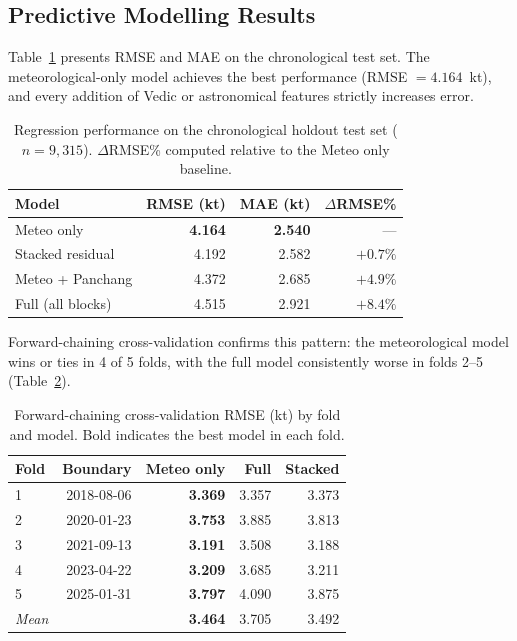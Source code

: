 \documentclass[12pt,a4paper]{article}
\begin{document}
\subsection{Predictive Modelling Results}

Table~\ref{tab:rmse} presents RMSE and MAE on the chronological test set.
The meteorological-only model achieves the best performance
(RMSE $= 4.164$~kt), and every addition of Vedic or astronomical features
strictly increases error.

\begin{table}[H]
  \centering
  \caption{Regression performance on the chronological holdout test set
  ($n = 9{,}315$). $\Delta$RMSE\% computed relative to the Meteo only baseline.}
  \label{tab:rmse}
  \begin{tabular}{lrrr}
    \toprule
    \textbf{Model} & \textbf{RMSE (kt)} & \textbf{MAE (kt)} & \boldmath$\Delta$\textbf{RMSE\%} \\
    \midrule
    Meteo only            & \textbf{4.164} & \textbf{2.540} & --- \\
    Stacked residual      & 4.192 & 2.582 & $+0.7\%$ \\
    Meteo + Panchang      & 4.372 & 2.685 & $+4.9\%$ \\
    Full (all blocks)     & 4.515 & 2.921 & $+8.4\%$ \\
    \bottomrule
  \end{tabular}
\end{table}

Forward-chaining cross-validation confirms this pattern: the meteorological
model wins or ties in 4 of 5 folds, with the full model consistently worse
in folds 2--5 (Table~\ref{tab:cv}).

\begin{table}[H]
  \centering
  \caption{Forward-chaining cross-validation RMSE (kt) by fold and model.
  Bold indicates the best model in each fold.}
  \label{tab:cv}
  \begin{tabular}{lrrrr}
    \toprule
    \textbf{Fold} & \textbf{Boundary} & \textbf{Meteo only} & \textbf{Full} & \textbf{Stacked} \\
    \midrule
    1 & 2018-08-06 & \textbf{3.369} & 3.357 & 3.373 \\
    2 & 2020-01-23 & \textbf{3.753} & 3.885 & 3.813 \\
    3 & 2021-09-13 & \textbf{3.191} & 3.508 & 3.188 \\
    4 & 2023-04-22 & \textbf{3.209} & 3.685 & 3.211 \\
    5 & 2025-01-31 & \textbf{3.797} & 4.090 & 3.875 \\
    \midrule
    \textit{Mean} & & \textbf{3.464} & 3.705 & 3.492 \\
    \bottomrule
  \end{tabular}
\end{table}
\end{document}
